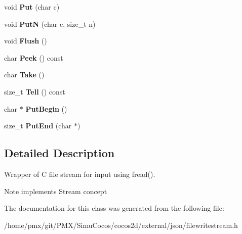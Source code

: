 \begin{DoxyCompactItemize}
\item 
\mbox{\label{classFileWriteStream_af6a6061d0accd939fa475b9b34427d85}} 
void {\bfseries Put} (char c)
\item 
\mbox{\label{classFileWriteStream_ad9ec108b24316a2c1c83c6ddc75d308a}} 
void {\bfseries PutN} (char c, size\+\_\+t n)
\item 
\mbox{\label{classFileWriteStream_a939fbf183ba36464c5e0837df4329d37}} 
void {\bfseries Flush} ()
\item 
\mbox{\label{classFileWriteStream_ab556c7e26346ddff0e579a53c09c3a13}} 
char {\bfseries Peek} () const
\item 
\mbox{\label{classFileWriteStream_ac927a0ae09a85eaba58a74ceb04b40ed}} 
char {\bfseries Take} ()
\item 
\mbox{\label{classFileWriteStream_a06272de32d6ac4d10c9bd5deb79a0234}} 
size\+\_\+t {\bfseries Tell} () const
\item 
\mbox{\label{classFileWriteStream_a4d1340a64fde3f16ac2afce19537c75e}} 
char $\ast$ {\bfseries Put\+Begin} ()
\item 
\mbox{\label{classFileWriteStream_a54b14047e4c998db0594290605f8f0dc}} 
size\+\_\+t {\bfseries Put\+End} (char $\ast$)
\end{DoxyCompactItemize}


\subsection{Detailed Description}
Wrapper of C file stream for input using fread(). 

\begin{DoxyNote}{Note}
implements Stream concept 
\end{DoxyNote}


The documentation for this class was generated from the following file\+:\begin{DoxyCompactItemize}
\item 
/home/pmx/git/\+P\+M\+X/\+Simu\+Cocos/cocos2d/external/json/filewritestream.\+h\end{DoxyCompactItemize}
